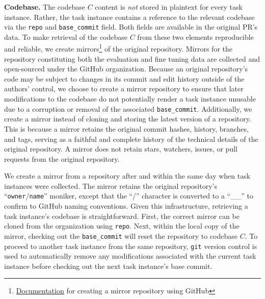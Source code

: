\textbf{Codebase.} The codebase $C$ content is \textit{not} stored in plaintext for every task instance. 
Rather, the task instance contains a reference to the relevant codebase via the \texttt{repo} and \texttt{base\_commit} field.
Both fields are available in the original PR's data. To make retrieval of the codebase $C$ from these two elements reproducible and reliable, we create mirrors\footnote{\href{https://docs.github.com/en/repositories/creating-and-managing-repositories/duplicating-a-repository}{Documentation} for creating a mirror repository using GitHub} of the original repository.
Mirrors for the repository constituting both the evaluation and fine tuning data are collected and open-sourced under the \benchmark{} GitHub organization.
Because an original repository's code may be subject to changes in its commit and edit history outside of the authors' control, we choose to create a mirror repository to ensure that later modifications to the codebase do not potentially render a task instance unusable due to a corruption or removal of the associated \texttt{base\_commit}.
Additionally, we create a mirror instead of cloning and storing the latest version of a repository. This is because a mirror retains the original commit hashes, history, branches, and tags, serving as a faithful and complete history of the technical details of the original repository.
A mirror does not retain stars, watchers, issues, or pull requests from the original repository.

We create a mirror from a repository after and within the same day when task instances were collected.
The mirror retains the original repository's ``\texttt{owner}/\texttt{name}'' moniker, except that the ``/'' character is converted to a ``\_\_'' to confirm to GitHub naming conventions.
Given this infrastructure, retrieving a task instance's codebase is straightforward.
First, the correct mirror can be cloned from the \benchmark{} organization using \texttt{repo}.
Next, within the local copy of the mirror, checking out the \texttt{base\_commit} will reset the repository to codebase $C$.
To proceed to another task instance from the same repository, \texttt{git} version control is used to automatically remove any modifications associated with the current task instance before checking out the next task instance's base commit.

